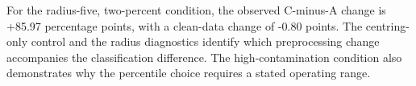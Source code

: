 For the radius-five, two-percent condition, the observed C-minus-A change is +85.97 percentage points, with a clean-data change of -0.80 points. The centring-only control and the radius diagnostics identify which preprocessing change accompanies the classification difference. The high-contamination condition also demonstrates why the percentile choice requires a stated operating range.
